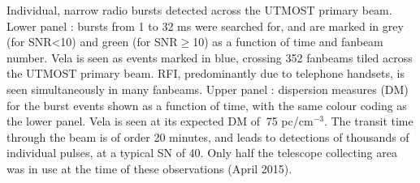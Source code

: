 Individual, narrow radio bursts detected across the UTMOST primary beam. Lower panel : bursts from 1 to 32 ms were searched for, and are marked in grey (for SNR<10) and green (for SNR$\ge$10) as a function of time and fanbeam number. Vela is seen as events marked in blue, crossing 352 fanbeams tiled across the UTMOST primary beam. RFI, predominantly due to telephone handsets, is seen simultaneously in many fanbeams. Upper panel : dispersion measures (DM) for the burst events shown as a function of time, with the same colour coding as the lower panel. Vela is seen at its expected DM of $~$75 pc/cm$^{-3}$. The transit time through the beam is of order 20 minutes, and leads to detections of thousands of individual pulses, at a typical SN of 40. Only half the telescope collecting area was in use at the time of these observations (April 2015). 